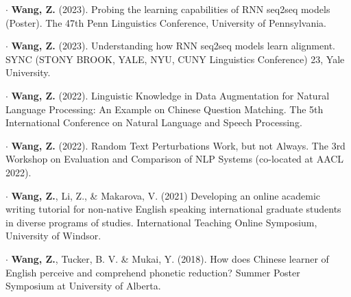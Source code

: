 \documentclass[letterpaper,11pt]{article}
\newcommand{\resumeSubHeadingListStart}{\begin{itemize}[leftmargin=0.15in, label={}]}
\newcommand{\resumeSubHeadingListEnd}{\end{itemize}}
\begin{document}
  \resumeSubHeadingListStart
    \small{\item{
%        
%        

        $\cdot$ \textbf{Wang, Z.} (2023). Probing the learning capabilities of RNN seq2seq models (Poster). The 47th Penn Linguistics Conference, University of Pennsylvania. \\ \vspace{2pt}

        $\cdot$ \textbf{Wang, Z.} (2023). Understanding how RNN seq2seq models learn alignment. SYNC (STONY BROOK, YALE, NYU, CUNY Linguistics Conference) 23, Yale University. \\ \vspace{2pt}
        
        $\cdot$ \textbf{Wang, Z.} (2022). Linguistic Knowledge in Data Augmentation for Natural Language Processing: An Example on Chinese Question Matching. The 5th International Conference on Natural Language and Speech Processing. \\ \vspace{2pt}
        
        $\cdot$ \textbf{Wang, Z.} (2022). Random Text Perturbations Work, but not Always. The 3rd Workshop on Evaluation and Comparison of NLP Systems (co-located at AACL 2022). \\ \vspace{2pt}
        
        $\cdot$ \textbf{Wang, Z.}, Li, Z., \& Makarova, V. (2021) Developing an online academic writing tutorial for non-native English speaking international graduate students in diverse programs of studies. International Teaching Online Symposium, University of Windsor. \\ \vspace{2pt}
        
        $\cdot$ \textbf{Wang, Z.}, Tucker, B. V. \& Mukai, Y. (2018). How does Chinese learner of English perceive and comprehend phonetic reduction? Summer Poster Symposium at University of Alberta.
    }} 
  \resumeSubHeadingListEnd
  
\end{document}
